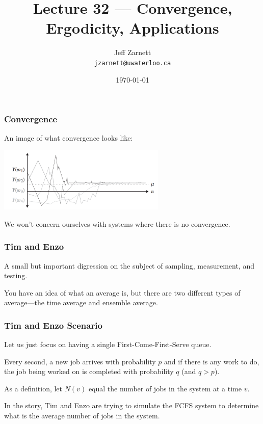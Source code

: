 

\title{Lecture 32 --- Convergence, Ergodicity, Applications}

\author{Jeff Zarnett\\ \small \texttt{jzarnett@uwaterloo.ca}}
\date{\today}




\begin{frame}
  \titlepage

 \end{frame}


\begin{frame}
\frametitle{Convergence}

An image of what convergence looks like:

\begin{center}
	\includegraphics[width=0.6\textwidth]{images/convergence.png}
\end{center}

We won't concern ourselves with systems where there is no convergence. 

\end{frame}



\begin{frame}
\frametitle{Tim and Enzo}

A small but important digression on the subject of sampling, measurement, and testing.

You have an idea of what an average is, but there are two different types of average---the time average and ensemble average. 


\end{frame}



\begin{frame}
\frametitle{Tim and Enzo Scenario}

Let us just focus on having a single First-Come-First-Serve queue. 

Every second, a new job arrives with probability $p$ and if there is any work to do, the job being worked on is completed with probability $q$ (and $q > p$). 

As a definition, let $N(v)$ equal the number of jobs in the system at a time $v$. 

In the story, Tim and Enzo are trying to simulate the FCFS system to determine what is the average number of jobs in the system.

\end{frame}



